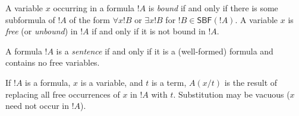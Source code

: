 \documentclass[syntax-and-semantics]{subfiles}
\begin{document}

\begin{defn}
A variable $x$ occurring in a formula $!A$ is \emph{bound} if and only if there is some subformula of $!A$ of the form $\forall x !B$ or $\exists x !B$ for $!B\in\mathsf{SBF}(!A)$. A variable $x$ is \emph{free} (or \emph{unbound}) in $!A$ if and only if it is not bound in $!A$. \end{defn}

\begin{defn}[Sentence]
A formula $!A$ is a \emph{sentence} if and only if it is a (well-formed) formula and contains no free variables.\end{defn}


\begin{defn}
If $!A$ is a formula, $x$ is a variable, and $t$ is a term, $A(x/t)$ is the result of replacing all free occurrences of $x$ in $!A$ with $t$. Substitution may be vacuous ($x$ need not occur in $!A$). \end{defn}
\end{document}
